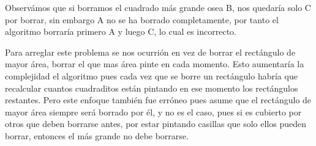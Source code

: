 \documentclass{article}
\begin{document}
Observámos que si borramos el cuadrado más grande osea B, nos quedaría solo C por borrar, sin embargo A no se ha borrado completamente, por tanto el algoritmo borraría primero A y luego C, lo cual es incorrecto.\\

\begin{center}


\end{center}


Para arreglar este problema se nos ocurrión en vez de borrar el rectángulo de mayor área, borrar el que mas área pinte en cada momento. Esto aumentaría la complejidad el algoritmo pues cada vez que se borre un rectángulo habría que recalcular cuantos cuadraditos están pintando en ese momento los rectángulos restantes. Pero este enfoque también fue erróneo pues asume que el rectángulo de mayor área siempre será borrado por él, y no es el caso, pues si es cubierto por otros que deben borrarse antes, por estar pintando casillas que solo ellos pueden borrar, entonces el más grande no debe borrarse.

\begin{center}


\end{center}
\end{document}
